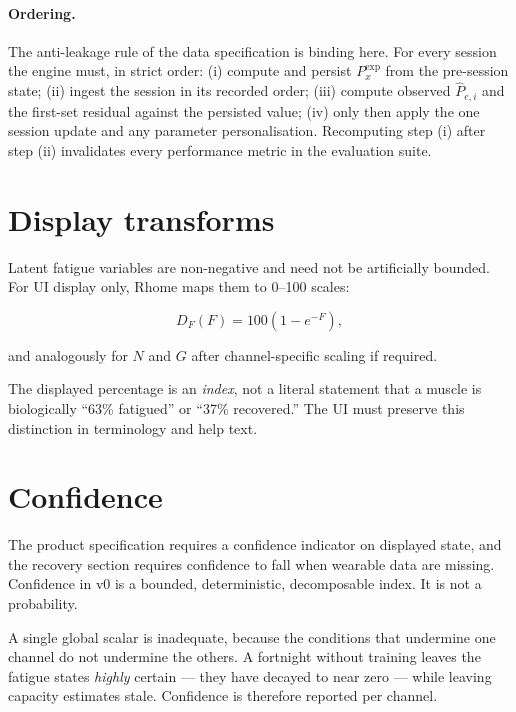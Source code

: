 \documentclass[11pt]{article}
\begin{document}
\paragraph{Ordering.} The anti-leakage rule of the data specification is binding here. For every session the engine must, in strict order: (i) compute and persist $P_x^{\mathrm{exp}}$ from the pre-session state; (ii) ingest the session in its recorded order; (iii) compute observed $\widehat P_{e,i}$ and the first-set residual against the persisted value; (iv) only then apply the one session update and any parameter personalisation. Recomputing step (i) after step (ii) invalidates every performance metric in the evaluation suite.

\section{Display transforms}
\label{sec:display}

Latent fatigue variables are non-negative and need not be artificially bounded. For UI display only, Rhome maps them to 0--100 scales:

\begin{equation}
D_F(F)=100\left(1-e^{-F}\right),
\end{equation}

and analogously for $N$ and $G$ after channel-specific scaling if required.

The displayed percentage is an \emph{index}, not a literal statement that a muscle is biologically ``63\% fatigued'' or ``37\% recovered.'' The UI must preserve this distinction in terminology and help text.

\section{Confidence}
\label{sec:conf}

The product specification requires a confidence indicator on displayed state, and the recovery section requires confidence to fall when wearable data are missing. Confidence in v0 is a bounded, deterministic, decomposable index. It is not a probability.

A single global scalar is inadequate, because the conditions that undermine one channel do not undermine the others. A fortnight without training leaves the fatigue states \emph{highly} certain --- they have decayed to near zero --- while leaving capacity estimates stale. Confidence is therefore reported per channel.
\end{document}
